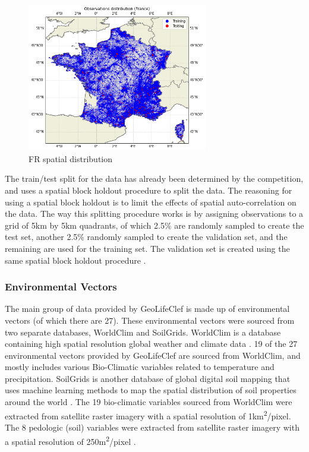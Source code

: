\documentclass[12pt, oneside]{article}
\begin{document}
\begin{normalsize}
\begin{figure}[H]
\caption{FR spatial distribution}
\centering
\includegraphics[width=0.7\textwidth]{fr_dist}
\end{figure}

The train/test split for the data has already been determined by the competition, and uses a spatial block holdout procedure to split the data. The reasoning for using a spatial block holdout is to limit the effects of spatial auto-correlation on the data. The way this splitting procedure works is by assigning observations to a grid of 5km by 5km quadrants, of which 2.5\% are randomly sampled to create the test set, another 2.5\% randomly sampled to create the validation set, and the remaining are used for the training set. The validation set is created using the same spatial block holdout procedure \cite{lorieul2021overview}.

\subsubsection{Environmental Vectors}

The main group of data provided by GeoLifeClef is made up of environmental vectors (of which there are 27). These environmental vectors were sourced from two separate databases, WorldClim and SoilGrids. WorldClim is a database containing high spatial resolution global weather and climate data \cite{hijmans2005very}. 19 of the 27 environmental vectors provided by GeoLifeClef are sourced from WorldClim, and mostly includes various Bio-Climatic variables related to temperature and precipitation. SoilGrids is another database of global digital soil mapping that uses machine learning methods to map the spatial distribution of soil properties around the world \cite{hengl2017soilgrids250m}. The 19 bio-climatic variables sourced from WorldClim were extracted from satellite raster imagery with a spatial resolution of 1km\textsuperscript{2}/pixel. The 8 pedologic (soil) variables were extracted from satellite raster imagery with a spatial resolution of 250m\textsuperscript{2}/pixel \cite{lorieul2021overview}.


\end{normalsize}
\end{document}
